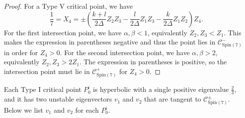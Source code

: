 \documentclass[11pt,letterpaper]{amsart}
\theoremstyle{definition}
\numberwithin{equation}{section}
\newcommand{\spin}{\mathrm{Spin}}
\begin{document}
\begin{proof}
For a Type V critical point, we have 
$$\frac{1}{7}=X_4=\pm\left(\frac{k+l}{2\Delta}Z_2Z_3-\frac{l}{2\Delta}Z_1Z_3-\frac{k}{2\Delta}Z_1Z_2\right)Z_4.$$ For the first intersection point, we have $\alpha, \beta < 1$,  equivalently $Z_2,Z_3 < Z_1$. This makes the expression in parentheses negative and thus the point lies in $\mathcal{C}_{\spin(7)}^-$ in order for $Z_4>0$. For the second intersection point, we have $\alpha,\beta>2$, equivalently $Z_2,Z_3>2Z_1$. The expression in parentheses is positive, so the intersection point must lie in $\mathcal{C}_{\spin(7)}^+$ for $Z_4>0$.
\end{proof}

Each Type I critical point $P_0^i$ is hyperbolic with a single positive eigenvalue $\frac{2}{3}$, and it has two unstable eigenvectors $v_1$ and $v_2$ that are tangent to $\mathcal{C}_{\spin(7)}^\pm$. Below we list $v_1$ and $v_2$ for each $P_0^i$.
\end{document}
